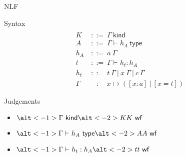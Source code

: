 \documentclass[ignorenonframetext,red]{beamer}
\newcommand\gor{\ |\ }
\newcommand\gequal{\ ::=\ }
\newcommand\app[1]{{#1}\ }
\newcommand\eent[1]{[{#1}]}
\newcommand\jlangt[4]{{#2}\vdash_{\mathrm{#1}}{#3}:{#4}}
\newcommand\jlangA[3]{{#2}\vdash_{\mathrm{#1}}{#3}\mathsf{\ type}}
\newcommand\jlangK[3]{{#2}\vdash_{\mathrm{#1}}{#3}\mathsf{\ kind}}
\newcommand\jnlft[3]{\jlangt{}{#1}{#2}{#3}}
\newcommand\jnlfA[2]{\jlangA{}{#1}{#2}}
\newcommand\jnlfK[1]{{#1}\ \mathsf{kind}} %
\newcommand\jwf[1]{{#1}\ \mathsf{wf}}
\begin{document}
\begin{frame}{NLF}
  \begin{block}{Syntax}
    \begin{align*}
      \\[-3em]
      K &\gequal \jnlfK\Gamma \\
      A &\gequal \jnlfA\Gamma{h_A} \\
      h_A &\gequal \app a \Gamma \\
      t &\gequal \jnlft\Gamma{h_t}{h_A} \\
      h_t &\gequal \app t\Gamma \gor
      \app x\Gamma \gor \app c\Gamma \\
      \Gamma &\quad :\quad x \mapsto (\eent{x:a} \gor \eent{x=t})
    \end{align*}
  \end{block}
  \begin{overlayarea}{\textwidth}{\textwidth}
    \begin{block}{Judgements}
      \begin{itemize}
      \item $\alt<-1>{\jnlfK\Gamma}{\alt<-2> K {\jwf K}}$
      \item $\alt<-1>{\jnlfA\Gamma{h_A}}{\alt<-2> A {\jwf A}}$
      \item $\alt<-1>{\jnlft\Gamma{h_t}{h_A}}{\alt<-2> t {\jwf t}}$
      \end{itemize}
    \end{block}
  \end{overlayarea}
  \pause\pause
\end{frame}
\end{document}
